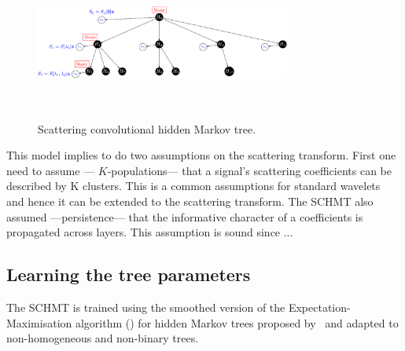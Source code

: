 \documentclass{article}
\begin{document}
    \begin{figure}
      \begin{center}
				\includegraphics[width=3.3in, height=2in, keepaspectratio]{scat_HMT_crop.pdf}
				\caption{Scattering convolutional hidden Markov tree.}
				\label{fig:SCHMT 1}
						\end{center}
    \end{figure}

    This model implies to do two assumptions on the scattering transform. First one need to assume --- $K$-populations--- that a signal’s scattering coefficients can be described by K clusters. This is a common assumptions for standard wavelets~\citep{kingsbury2001complex} and hence it can be extended to the scattering transform. The SCHMT also assumed ---persistence--- that the informative character of a coefficients is propagated across layers. This assumption is sound since ...

  \subsection{Learning the tree parameters}
    \label{subsec:SCHMT/Learning}    

    The SCHMT is trained using the smoothed version of the Expectation-Maximisation algorithm (\cite{someone}) for hidden Markov trees proposed by~\citep{Durand} and adapted to non-homogeneous and non-binary trees.
    
\end{document}
